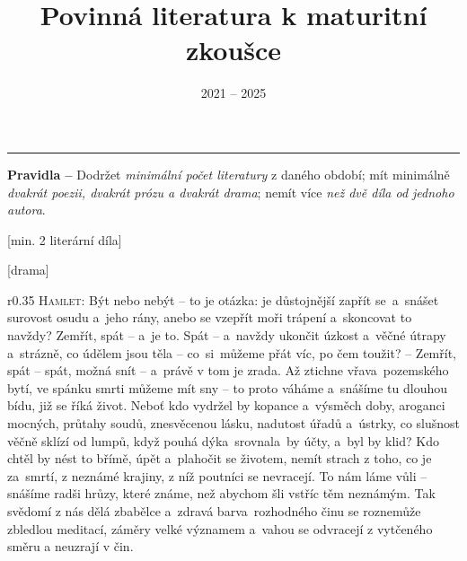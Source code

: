 \documentclass{extarticle} %
\author{\theauthor}
\title{Povinná literatura k maturitní zkoušce}
\date{2021 -- 2025}
\begin{document}
\changefontsize{7pt}


\tableofcontents

\vfill\noindent\begin{minipage}{\textwidth}
    {\textcolor{TOC}{\rule{\linewidth}{0.4pt}}\vspace{1em}
    \footnotesize\textbf{\color{TOC}Pravidla --} Dodržet \textit{\color{TOC}minimální počet literatury} z daného období;
    mít minimálně \textit{\color{TOC}dvakrát poezii, dvakrát prózu a dvakrát drama};
    nemít více \textit{\color{TOC}než dvě díla od jednoho autora}.}
\end{minipage}

\thispagestyle{empty}

\newpage


\newpage

\setcounter{page}{1}

[min. 2 literární díla]


\changefontsize{6.4pt}

[drama]

\noindent\begin{wrapfigure}{r}{0.35\textwidth}
\tiny{}\setlength{\parindent}{3pt}\noindent\textsc{Hamlet:} Být nebo nebýt -- to je otázka:
je důstojnější zapřít se~a~snášet surovost osudu a~jeho rány, anebo se vzepřít moři trápení a~skoncovat to navždy?
Zemřít, spát -- a~je to.
Spát -- a~navždy ukončit úzkost a~věčné útrapy a~strázně, co údělem jsou těla -- co~si~můžeme přát víc, po čem toužit?
-- Zemřít, spát -- spát, možná snít -- a~právě v tom je zrada.
Až ztichne vřava~pozemského bytí, ve spánku smrti můžeme mít sny -- to proto váháme a~snášíme tu dlouhou bídu, již se říká život.
Neboť kdo vydržel by kopance a~výsměch doby, aroganci mocných, průtahy soudů, znesvěcenou lásku, nadutost úřadů a~ústrky, co slušnost věčně sklízí od lumpů, když pouhá dýka~srovnala~by účty, a~byl by klid?
Kdo chtěl by nést to břímě, úpět a~plahočit se životem, nemít strach z toho, co je za~smrtí, z neznámé krajiny, z níž poutníci se nevracejí.
To nám láme vůli -- snášíme radši hrůzy, které známe, než abychom šli vstříc těm neznámým.
Tak svědomí z nás dělá zbabělce a~zdravá barva~rozhodného činu se roznemůže zbledlou meditací, záměry velké významem a~vahou se odvracejí z vytčeného směru a neuzrají v čin.
\end{wrapfigure}
\end{document}
